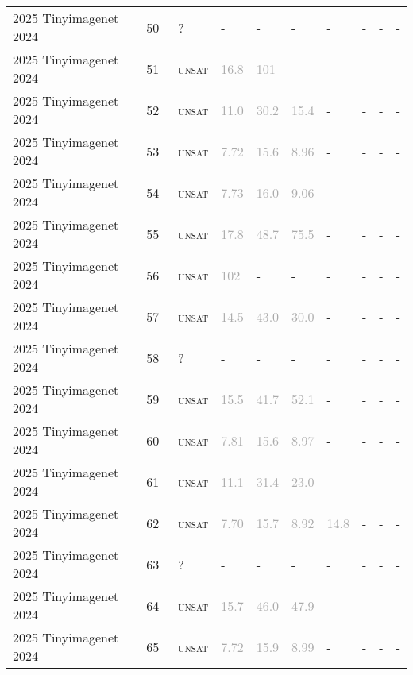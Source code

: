 \begin{center}
{\begin{longtable}{@{}llllllllll@{}}
2025 Tinyimagenet 2024 & 50 & ~? & - & - & - & - & - & - & - \\
2025 Tinyimagenet 2024 & 51 & ~\textsc{unsat} & \textcolor{darkgray}{16.8} & \textcolor{darkgray}{101} & - & - & - & - & - \\
2025 Tinyimagenet 2024 & 52 & ~\textsc{unsat} & \textcolor{darkgray}{11.0} & \textcolor{darkgray}{30.2} & \textcolor{darkgray}{15.4} & - & - & - & - \\
2025 Tinyimagenet 2024 & 53 & ~\textsc{unsat} & \textcolor{darkgray}{7.72} & \textcolor{darkgray}{15.6} & \textcolor{darkgray}{8.96} & - & - & - & - \\
2025 Tinyimagenet 2024 & 54 & ~\textsc{unsat} & \textcolor{darkgray}{7.73} & \textcolor{darkgray}{16.0} & \textcolor{darkgray}{9.06} & - & - & - & - \\
2025 Tinyimagenet 2024 & 55 & ~\textsc{unsat} & \textcolor{darkgray}{17.8} & \textcolor{darkgray}{48.7} & \textcolor{darkgray}{75.5} & - & - & - & - \\
2025 Tinyimagenet 2024 & 56 & ~\textsc{unsat} & \textcolor{darkgray}{102} & - & - & - & - & - & - \\
2025 Tinyimagenet 2024 & 57 & ~\textsc{unsat} & \textcolor{darkgray}{14.5} & \textcolor{darkgray}{43.0} & \textcolor{darkgray}{30.0} & - & - & - & - \\
2025 Tinyimagenet 2024 & 58 & ~? & - & - & - & - & - & - & - \\
2025 Tinyimagenet 2024 & 59 & ~\textsc{unsat} & \textcolor{darkgray}{15.5} & \textcolor{darkgray}{41.7} & \textcolor{darkgray}{52.1} & - & - & - & - \\
2025 Tinyimagenet 2024 & 60 & ~\textsc{unsat} & \textcolor{darkgray}{7.81} & \textcolor{darkgray}{15.6} & \textcolor{darkgray}{8.97} & - & - & - & - \\
2025 Tinyimagenet 2024 & 61 & ~\textsc{unsat} & \textcolor{darkgray}{11.1} & \textcolor{darkgray}{31.4} & \textcolor{darkgray}{23.0} & - & - & - & - \\
2025 Tinyimagenet 2024 & 62 & ~\textsc{unsat} & \textcolor{darkgray}{7.70} & \textcolor{darkgray}{15.7} & \textcolor{darkgray}{8.92} & \textcolor{darkgray}{14.8} & - & - & - \\
2025 Tinyimagenet 2024 & 63 & ~? & - & - & - & - & - & - & - \\
2025 Tinyimagenet 2024 & 64 & ~\textsc{unsat} & \textcolor{darkgray}{15.7} & \textcolor{darkgray}{46.0} & \textcolor{darkgray}{47.9} & - & - & - & - \\
2025 Tinyimagenet 2024 & 65 & ~\textsc{unsat} & \textcolor{darkgray}{7.72} & \textcolor{darkgray}{15.9} & \textcolor{darkgray}{8.99} & - & - & - & - \\

\end{longtable}}
\end{center}
